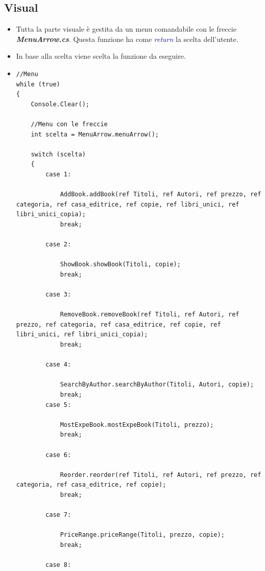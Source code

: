 \documentclass[a4paper,12pt]{article}
\begin{document}
\subsection{Visual}
\begin{itemize}
    \item Tutta la parte visuale è gestita da un menu comandabile con le freccie \textbf{\textit{MenuArrow.cs}}. \newline Questa funzione ha come \textcolor{blue}{\textit{return}} la scelta dell'utente.
    \item In base alla scelta viene scelta la funzione da eseguire.
    \item \begin{lstlisting}[caption=Funzione per il menu]
        //Menu
while (true)
{
    Console.Clear();
       
    //Menu con le freccie
    int scelta = MenuArrow.menuArrow();
       
    switch (scelta)
    {
        case 1:
                    
            AddBook.addBook(ref Titoli, ref Autori, ref prezzo, ref categoria, ref casa_editrice, ref copie, ref libri_unici, ref libri_unici_copia);
            break;
       
        case 2:
                    
            ShowBook.showBook(Titoli, copie);
            break;
       
        case 3:
                    
            RemoveBook.removeBook(ref Titoli, ref Autori, ref prezzo, ref categoria, ref casa_editrice, ref copie, ref libri_unici, ref libri_unici_copia);
            break;
       
        case 4:
                    
            SearchByAuthor.searchByAuthor(Titoli, Autori, copie);
            break;
        case 5:
                    
            MostExpeBook.mostExpeBook(Titoli, prezzo);
            break;
       
        case 6:
       
            Reorder.reorder(ref Titoli, ref Autori, ref prezzo, ref categoria, ref casa_editrice, ref copie);
            break;
       
        case 7:
       
            PriceRange.priceRange(Titoli, prezzo, copie);
            break;
       
        case 8:
                    

\end{lstlisting}
\end{itemize}
\end{document}
